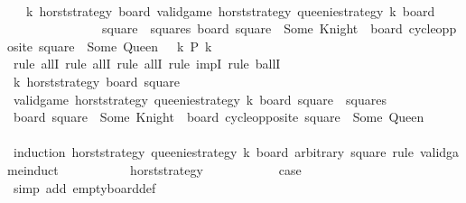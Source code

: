 \begin{isabellebody}
\isanewline
\ \ \ \ \isamarkupfalse%
\ {}{\isacharcolon}\ {\isachardoublequoteopen}{\isasymforall}\ k\ horst{\isacharunderscore}strategy\ board{\isachardot}\ valid{\isacharunderscore}game\ horst{\isacharunderscore}strategy\ {\isacharquery}queenie{\isacharunderscore}strategy\ k\ board\ {\isasymlongrightarrow}\ \isanewline
\ \ \ \ \ \ \ \ \ \ \ \ \ \ {\isacharparenleft}{\isasymforall}\ square\ {\isasymin}\ squares{\isachardot}\ board\ square\ {\isacharequal}\ Some\ Knight\ {\isasymlongleftrightarrow}\ board\ {\isacharparenleft}cycle{\isacharunderscore}opposite\ square{\isacharparenright}\ {\isacharequal}\ Some\ Queen{\isacharparenright}{\isachardoublequoteclose}\ {\isacharparenleft}\ {\isachardoublequoteopen}{\isasymforall}\ k{\isachardot}\ {\isacharquery}P\ k{\isachardoublequoteclose}{\isacharparenright}\isanewline
\ \ \ \ \isamarkupfalse%
\ {\isacharparenleft}rule\ allI{\isacharcomma}\ rule\ allI{\isacharcomma}\ rule\ allI{\isacharcomma}\ rule\ impI{\isacharcomma}\ rule\ ballI{\isacharparenright}\isanewline
\ \ \ \ \ \ \isamarkupfalse%
\ k\ horst{\isacharunderscore}strategy\ board\ square\isanewline
\ \ \ \ \ \ \isamarkupfalse%
\ {\isachardoublequoteopen}valid{\isacharunderscore}game\ horst{\isacharunderscore}strategy\ {\isacharquery}queenie{\isacharunderscore}strategy\ k\ board{\isachardoublequoteclose}\ {\isachardoublequoteopen}square\ {\isasymin}\ squares{\isachardoublequoteclose}\isanewline
\ \ \ \ \ \ \isamarkupfalse%
\ \isamarkupfalse%
\ {\isachardoublequoteopen}{\isacharparenleft}board\ square\ {\isacharequal}\ Some\ Knight{\isacharparenright}\ {\isacharequal}\ {\isacharparenleft}board\ {\isacharparenleft}cycle{\isacharunderscore}opposite\ square{\isacharparenright}\ {\isacharequal}\ Some\ Queen{\isacharparenright}{\isachardoublequoteclose}\isanewline
\ \ \ \ \ \ \isamarkupfalse%
\ {\isacharparenleft}induction\ horst{\isacharunderscore}strategy\ {\isacharquery}queenie{\isacharunderscore}strategy\ k\ board\ arbitrary{\isacharcolon}\ square\ rule{\isacharcolon}\ valid{\isacharunderscore}game{\isachardot}induct{\isacharparenright}\isanewline
\ \ \ \ \ \ \ \ \isamarkupfalse%
\ {\isacharparenleft}{}\ horst{\isacharunderscore}strategy{\isacharparenright}\isanewline
\ \ \ \ \ \ \ \ \isamarkupfalse%
\ \isamarkupfalse%
\ {\isacharquery}case\isanewline
\ \ \ \ \ \ \ \ \ \ \isamarkupfalse%
\ {\isacharparenleft}simp\ add{\isacharcolon}\ empty{\isacharunderscore}board{\isacharunderscore}def{\isacharparenright}\isanewline

\end{isabellebody}

